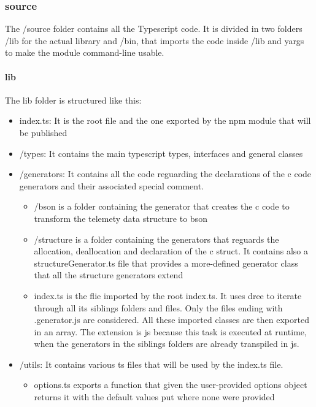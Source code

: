 \subsubsection{source}
The /source folder contains all the Typescript code. It is divided in two folders /lib for the actual library and /bin, that imports the code inside
/lib and yargs to make the module command-line usable.

\paragraph{lib}
The lib folder is structured like this:

\begin{itemize}
    \item index.ts: It is the root file and the one exported by the npm module that will be published
    \item /types: It contains the main typescript types, interfaces and general classes
    \item /generators: It contains all the code reguarding the declarations of the c code generators and their associated special comment.
        \begin{itemize}
            \item /bson is a folder containing the generator that creates the c code to transform the telemety data structure to bson
            \item /structure is a folder containing the generators that reguards the allocation, deallocation and declaration of the c struct. It contains also a structureGenerator.ts file that provides a more-defined generator class that all the structure generators extend
            \item index.ts is the flie imported by the root index.ts. It uses dree to iterate through all its siblings folders and files. Only the files ending with .generator.js are considered. All these imported classes are then exported in an array. The extension is js because this task is executed at runtime, when the generators in the siblings folders are already transpiled in js.
        \end{itemize}
    \item /utils: It contains various ts files that will be used by the index.ts file. 
        \begin{itemize}
            \item options.ts exports a function that given the user-provided options object returns it with the default values put where none were provided

\end{itemize}
\end{itemize}
